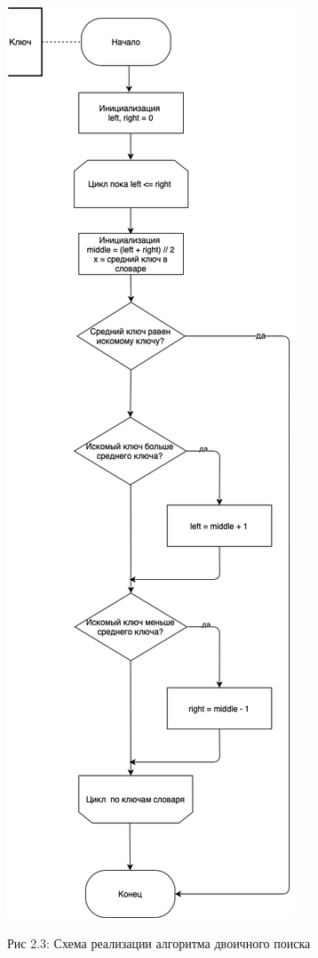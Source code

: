 \documentclass[12pt]{report}
\begin{document}
\begin{center}
		\includegraphics[scale=0.4]{schema/Bin.png}
		
			Рис 2.3: Схема реализации алгоритма двоичного поиска
\end{center}
\end{document}
